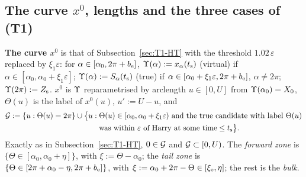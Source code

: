 \subsection{The curve \texorpdfstring{$x^0$}{x0}, lengths and the three cases of (T1)}\label{sec:HTp-curve}

\noindent\textbf{The curve $x^0$} is that of Subsection~\ref{sec:T1-HT} with the threshold $1.02\,\varepsilon$ replaced by $\xi_1\varepsilon$:
for $\alpha\in[\alpha_0,2\pi+b_{\mathrm e}]$, $\Upsilon(\alpha):=x_\alpha(t_{\mathrm s})$ (virtual) if $\alpha\in[\alpha_0,\alpha_0+\xi_1\varepsilon]$;
$\Upsilon(\alpha):=S_\alpha(t_{\mathrm s})$ (true) if $\alpha\in[\alpha_0+\xi_1\varepsilon,2\pi+b_{\mathrm e}]$, $\alpha\ne2\pi$; $\Upsilon(2\pi):=Z_{\mathrm s}$.
$x^0$ is $\Upsilon$ reparametrised by arclength $u\in[0,U]$ from $\Upsilon(\alpha_0)=X_0$, $\Theta(u)$ is the label of $x^0(u)$, $u':=U-u$, and
\begin{align*}
\mathcal G:=\{u:\Theta(u)=2\pi\}\cup\bigl\{u:{}&\Theta(u)\in[\alpha_0,\alpha_0+\xi_1\varepsilon)\text{ and the true candidate with label }\Theta(u)\\
&\text{was within $\varepsilon$ of Harry at some time}\le t_{\mathrm s}\bigr\}.
\end{align*}
Exactly as in Subsection~\ref{sec:T1-HT}, $0\in\mathcal G$ and $\mathcal G\subset[0,U)$. The \emph{forward zone} is $\{\Theta\in[\alpha_0,\alpha_0+\eta]\}$,
with $\xi:=\Theta-\alpha_0$; the \emph{tail zone} is $\{\Theta\in[2\pi+\alpha_0-\eta,2\pi+b_{\mathrm e}]\}$, with $\xi:=\alpha_0+2\pi-\Theta\in[\xi_{\mathrm e},\eta]$;
the rest is the \emph{bulk}.

